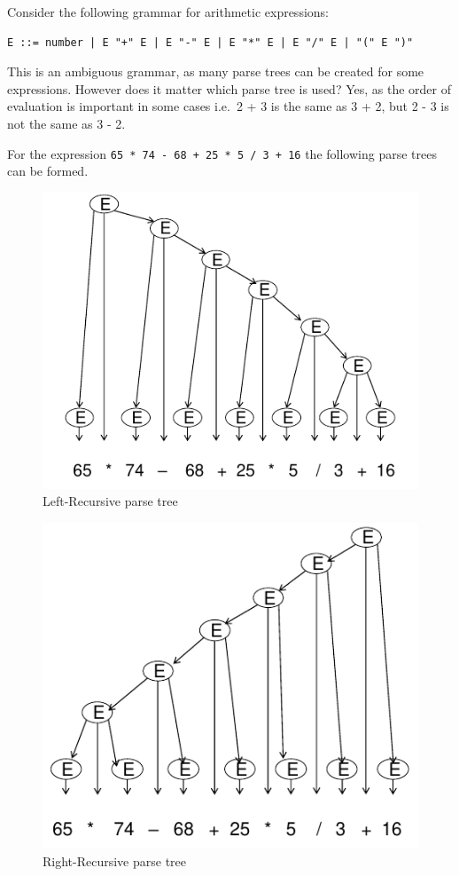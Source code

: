 \documentclass[
]{book}
\begin{document}
Consider the following grammar for arithmetic expressions:

\begin{verbatim}
E ::= number | E "+" E | E "-" E | E "*" E | E "/" E | "(" E ")"
\end{verbatim}

This is an ambiguous grammar, as many parse trees can be created for some expressions. However does it matter which parse tree is used? Yes, as the order of evaluation is important in some cases i.e.~2 + 3 is the same as 3 + 2, but 2 - 3 is not the same as 3 - 2.

For the expression \texttt{65\ *\ 74\ -\ 68\ +\ 25\ *\ 5\ /\ 3\ +\ 16} the following parse trees can be formed.

\begin{figure}
\includegraphics{img/09-image12} \caption{Left-Recursive parse tree}\label{fig:left-recursive}
\end{figure}

\begin{figure}
\includegraphics{img/09-image13} \caption{Right-Recursive parse tree}\label{fig:right-recursive}
\end{figure}
\end{document}
